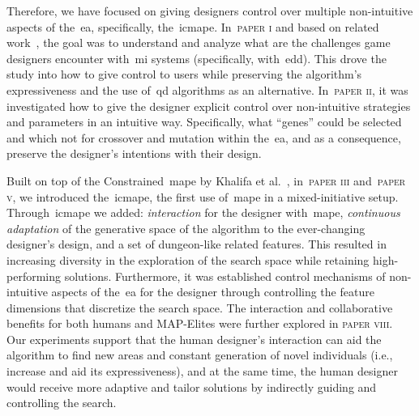 Therefore, we have focused on giving designers control over multiple non-intuitive aspects of the~\acrshort{ea}, specifically, the~\acrfull{icmape}. In~\textsc{paper i} and based on related work~\cite{baldwin_mixed-initiative_2017}, the goal was to understand and analyze what are the challenges game designers encounter with~\acrshort{mi} systems (specifically, with~\acrshort{edd}). This drove the study into how to give control to users while preserving the algorithm's expressiveness and the use of~\acrshort{qd} algorithms as an alternative. In~\textsc{paper ii}, it was investigated how to give the designer explicit control over non-intuitive strategies and parameters in an intuitive way. Specifically, what ``genes'' could be selected and which not for crossover and mutation within the~\acrshort{ea}, and as a consequence, preserve the designer's intentions with their design. 

Built on top of the Constrained~\acrshort{mape} by Khalifa et al.~\cite{khalifa_talakat_2018}, in~\textsc{paper iii} and~\textsc{paper v}, we introduced the~\acrlong{icmape}, the first use of~\acrshort{mape} in a mixed-initiative setup. Through~\acrshort{icmape} we added: \textit{interaction} for the designer with~\acrshort{mape}, \textit{continuous adaptation} of the generative space of the algorithm to the ever-changing designer's design, and a set of dungeon-like related features. This resulted in increasing diversity in the exploration of the search space while retaining high-performing solutions. Furthermore, it was established control mechanisms of non-intuitive aspects of the~\acrshort{ea} for the designer through controlling the feature dimensions that discretize the search space. The interaction and collaborative benefits for both humans and MAP-Elites were further explored in \textsc{paper viii}. Our experiments support that the human designer's interaction can aid the algorithm to find new areas and constant generation of novel individuals (i.e., increase and aid its expressiveness), and at the same time, the human designer would receive more adaptive and tailor solutions by indirectly guiding and controlling the search. 

